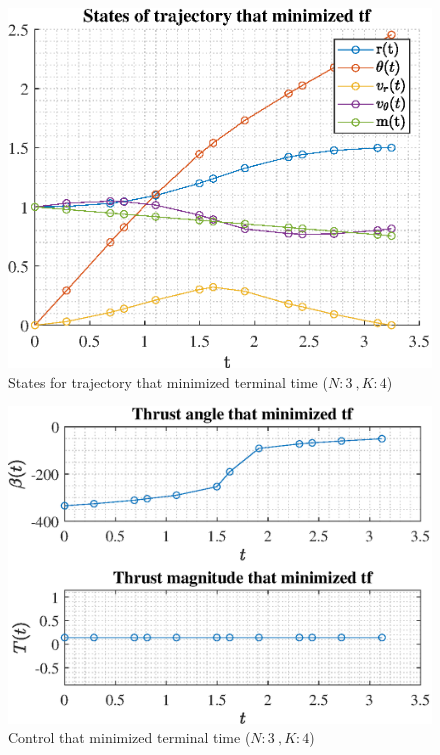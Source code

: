 \documentclass[]{article}
\begin{document}
	\begin{figure}
		\centering
		\includegraphics[scale=0.75]{states_N3_K4_C2_tf.eps}
		\caption{States for trajectory that minimized terminal time (\(N:3\ , K:4\))}
		\label{fig:states_N3_K4_C2_tf}
	\end{figure}
	\begin{figure}
		\centering
		\includegraphics[scale=0.75]{control_N3_K4_C2_tf.eps}
		\caption{Control that minimized terminal time (\(N:3\ , K:4\))}
		\label{fig:control_N3_K4_C2_tf}
	\end{figure}
\end{document}
